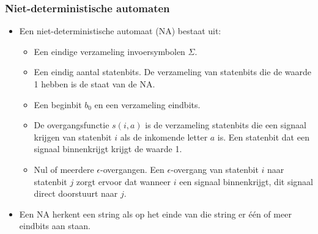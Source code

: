 \subsubsection{Niet-deterministische automaten}    
\begin{itemize}
     \item Een niet-deterministische automaat (NA) bestaat uit:
     \begin{itemize}
         \item Een eindige verzameling invoersymbolen $\Sigma$.
         \item Een eindig aantal statenbits. De verzameling van statenbits die de waarde 1 hebben is de staat van de NA.
         \item Een beginbit $b_0$ en een verzameling eindbits.
         \item De overgangsfunctie $s(i, a)$ is de verzameling statenbits die een signaal krijgen van statenbit $i$ als de inkomende letter $a$ is. Een statenbit dat een signaal binnenkrijgt krijgt de waarde 1.
         \item Nul of meerdere $\epsilon$-overgangen. Een $\epsilon$-overgang van statenbit $i$ naar statenbit $j$ zorgt ervoor dat wanneer $i$ een signaal binnenkrijgt, dit signaal direct doorstuurt naar $j$.
     \end{itemize}
     \item Een NA herkent een string als op het einde van die string er één of meer eindbits aan staan.
\end{itemize}

